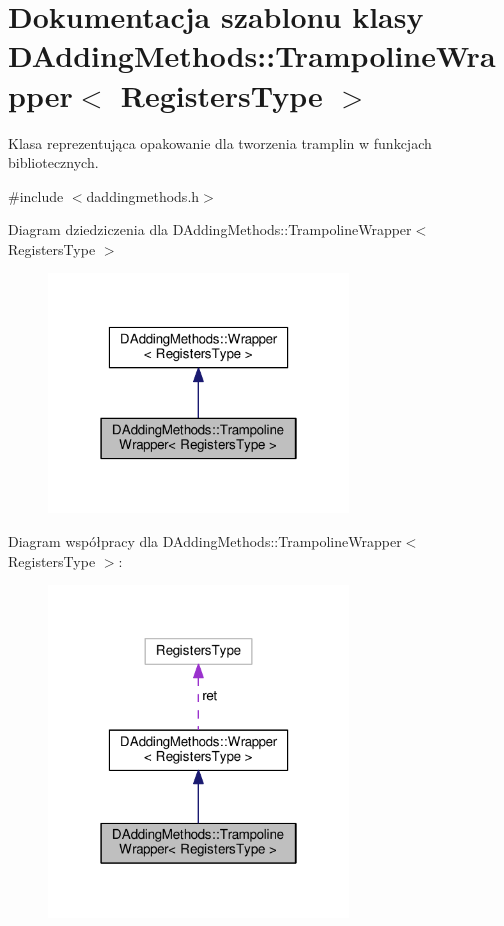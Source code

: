 \hypertarget{class_d_adding_methods_1_1_trampoline_wrapper}{\section{Dokumentacja szablonu klasy D\-Adding\-Methods\-:\-:Trampoline\-Wrapper$<$ Registers\-Type $>$}
\label{class_d_adding_methods_1_1_trampoline_wrapper}
}


Klasa reprezentująca opakowanie dla tworzenia tramplin w funkcjach bibliotecznych.  




{\ttfamily \#include $<$daddingmethods.\-h$>$}



Diagram dziedziczenia dla D\-Adding\-Methods\-:\-:Trampoline\-Wrapper$<$ Registers\-Type $>$
\nopagebreak
\begin{figure}[H]
\begin{center}
\leavevmode
\includegraphics[width=226pt]{class_d_adding_methods_1_1_trampoline_wrapper__inherit__graph}
\end{center}
\end{figure}


Diagram współpracy dla D\-Adding\-Methods\-:\-:Trampoline\-Wrapper$<$ Registers\-Type $>$\-:
\nopagebreak
\begin{figure}[H]
\begin{center}
\leavevmode
\includegraphics[width=226pt]{class_d_adding_methods_1_1_trampoline_wrapper__coll__graph}
\end{center}
\end{figure}
